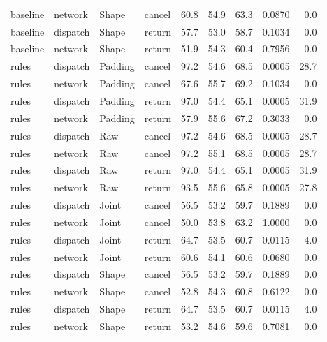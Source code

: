 \begin{table}[ht]
\begin{tabular}{@{}llllrrrrr@{}}
baseline & network & Shape & cancel & 60.8 & 54.9 & 63.3 & 0.0870 & 0.0\\

baseline & dispatch & Shape & return & 57.7 & 53.0 & 58.7 & 0.1034 & 0.0\\

baseline & network & Shape & return & 51.9 & 54.3 & 60.4 & 0.7956 & 0.0\\

rules & dispatch & Padding & cancel & 97.2 & 54.6 & 68.5 & 0.0005 & 28.7\\

rules & network & Padding & cancel & 67.6 & 55.7 & 69.2 & 0.1034 & 0.0\\

rules & dispatch & Padding & return & 97.0 & 54.4 & 65.1 & 0.0005 & 31.9\\

rules & network & Padding & return & 57.9 & 55.6 & 67.2 & 0.3033 & 0.0\\

rules & dispatch & Raw & cancel & 97.2 & 54.6 & 68.5 & 0.0005 & 28.7\\

rules & network & Raw & cancel & 97.2 & 55.1 & 68.5 & 0.0005 & 28.7\\

rules & dispatch & Raw & return & 97.0 & 54.4 & 65.1 & 0.0005 & 31.9\\

rules & network & Raw & return & 93.5 & 55.6 & 65.8 & 0.0005 & 27.8\\

rules & dispatch & Joint & cancel & 56.5 & 53.2 & 59.7 & 0.1889 & 0.0\\

rules & network & Joint & cancel & 50.0 & 53.8 & 63.2 & 1.0000 & 0.0\\

rules & dispatch & Joint & return & 64.7 & 53.5 & 60.7 & 0.0115 & 4.0\\

rules & network & Joint & return & 60.6 & 54.1 & 60.6 & 0.0680 & 0.0\\

rules & dispatch & Shape & cancel & 56.5 & 53.2 & 59.7 & 0.1889 & 0.0\\

rules & network & Shape & cancel & 52.8 & 54.3 & 60.8 & 0.6122 & 0.0\\

rules & dispatch & Shape & return & 64.7 & 53.5 & 60.7 & 0.0115 & 4.0\\

rules & network & Shape & return & 53.2 & 54.6 & 59.6 & 0.7081 & 0.0\\

\bottomrule\end{tabular}\end{table}

